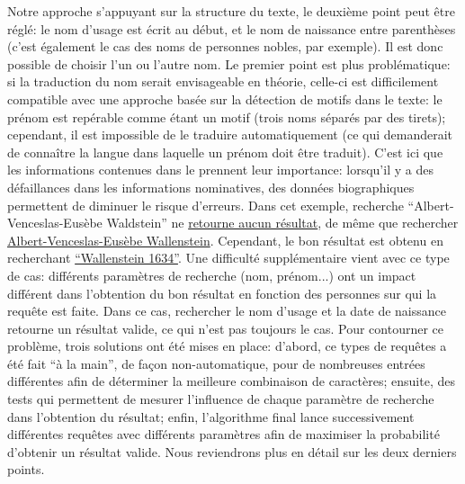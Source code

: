 Notre approche s'appuyant sur la structure du texte, le deuxième point peut être réglé: le nom d'usage est écrit au début, et le nom de naissance entre parenthèses (c'est également le cas des noms de personnes nobles, par exemple). Il est donc possible de choisir l'un ou l'autre nom. Le premier point est plus problématique: si la traduction du nom serait envisageable en théorie, celle-ci est difficilement compatible avec une approche basée sur la détection de motifs dans le texte: le prénom est repérable comme étant un motif (trois noms séparés par des tirets); cependant, il est impossible de le traduire automatiquement (ce qui demanderait de connaître la langue dans laquelle un prénom doit être traduit). C'est ici que les informations contenues dans le \ttrait{} prennent leur importance: lorsqu'il y a des défaillances dans les informations nominatives, des données biographiques permettent de diminuer le risque d'erreurs. Dans cet exemple, recherche \enquote{Albert-Venceslas-Eusèbe Waldstein} ne \href{https://www.wikidata.org/w/index.php?search=Albert-Venceslas-Eus%C3%A8be+de+Waldstein&title=Special:Search&profile=advanced&fulltext=1&ns0=1&ns120=1}{retourne aucun résultat}, de même que rechercher \href{https://www.wikidata.org/w/index.php?search=Albert-Venceslas-Eus%C3%A8be+Wallenstein&title=Special:Search&profile=advanced&fulltext=1&ns0=1&ns120=1}{Albert-Venceslas-Eusèbe Wallenstein}. Cependant, le bon résultat est obtenu en recherchant \href{https://www.wikidata.org/w/index.php?search=Wallenstein+1634&title=Special:Search&profile=advanced&fulltext=1&ns0=1&ns120=1}{\enquote{Wallenstein 1634}}. Une difficulté supplémentaire vient avec ce type de cas: différents paramètres de recherche (nom, prénom...) ont un impact différent dans l'obtention du bon résultat en fonction des personnes sur qui la requête est faite. Dans ce cas, rechercher le nom d'usage et la date de naissance retourne un résultat valide, ce qui n'est pas toujours le cas. Pour contourner ce problème, trois solutions ont été mises en place: d'abord, ce types de requêtes a été fait \enquote{à la main}, de façon non-automatique, pour de nombreuses entrées différentes afin de déterminer la meilleure combinaison de caractères; ensuite, des tests qui permettent de mesurer l'influence de chaque paramètre de recherche dans l'obtention du résultat; enfin, l'algorithme final lance successivement différentes requêtes avec différents paramètres afin de maximiser la probabilité d'obtenir un résultat valide. Nous reviendrons plus en détail sur les deux derniers points.

